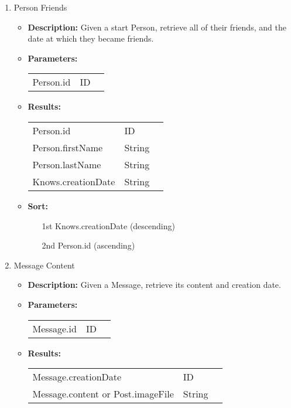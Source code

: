 {\begin{enumerate}
  \item Person Friends
    \begin{itemize}
      \item \textbf{Description:}
        Given a start Person, retrieve all of their friends, and the date at which they became friends.
      \item \textbf{Parameters:} \\
        \begin{tabular}{lll}
          Person.id 										& ID \\
        \end{tabular}
      \item \textbf{Results:} \\
        \begin{tabular}{lll}
          Person.id     									& ID \\
          Person.firstName     						& String \\
          Person.lastName    							& String \\
          Knows.creationDate    					& String \\
        \end{tabular}
      \item \textbf{Sort:}
        \begin{itemize}
          \item[1st] Knows.creationDate (descending)
          \item[2nd] Person.id (ascending)
        \end{itemize}
    \end{itemize}

  \item Message Content 
    \begin{itemize}
      \item \textbf{Description:}
        Given a Message, retrieve its content and creation date.
      \item \textbf{Parameters:} \\
        \begin{tabular}{lll}
          Message.id 										& ID \\
        \end{tabular}
      \item \textbf{Results:} \\
        \begin{tabular}{lll}
          Message.creationDate   									& ID \\
          Message.content or Post.imageFile           										& String \\
        \end{tabular}
    \end{itemize}


\end{enumerate}}
